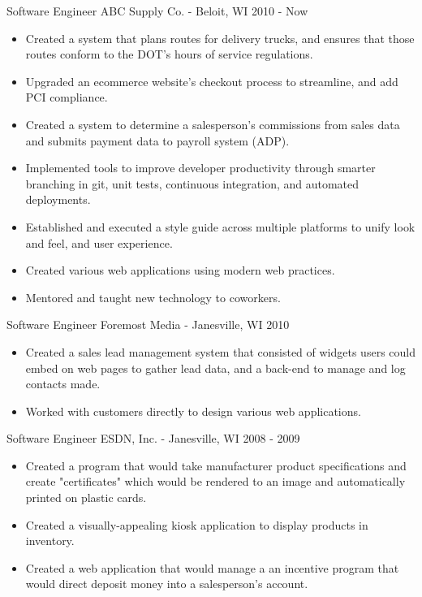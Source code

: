 \documentclass[]{clean-resume}
\begin{document}
\entry
	{Software Engineer}
	{ABC Supply Co. - Beloit, WI}
	{2010 - Now}
	{
		\begin{itemize}
			\item Created a system that plans routes for delivery trucks, and ensures that those routes conform to the DOT's hours of service regulations.
		
			\item Upgraded an ecommerce website's checkout process to streamline, and add PCI compliance.
			
			\item Created a system to determine a salesperson's commissions from sales data and submits payment data to payroll system (ADP).
		
			\item Implemented tools to improve developer productivity through smarter branching in git, unit tests, continuous integration, and automated deployments.
		
			\item Established and executed a style guide across multiple platforms to unify look and feel, and user experience.
		
		
		 	\item Created various web applications using modern web practices.
		
			\item Mentored and taught new technology to coworkers.
		\end{itemize}
		
	}

\entry
	{Software Engineer}
	{Foremost Media - Janesville, WI}
	{2010}
	{
		\begin{itemize}
			\item Created a sales lead management system that consisted of widgets users could embed on web pages to gather lead data, and a back-end to manage and log contacts made.
			\item Worked with customers directly to design various web applications.
		\end{itemize}
		
	}
	
\entry
	{Software Engineer}
	{ESDN, Inc. - Janesville, WI}
	{2008 - 2009}
	{
		\begin{itemize}
			\item Created a program that would take manufacturer product specifications and create "certificates" which would be rendered to an image and automatically printed on plastic cards.
			\item Created a visually-appealing kiosk application to display products in inventory.
			\item Created a web application that would manage a an incentive program that would direct deposit money into a salesperson's account.
		\end{itemize}
		
	}
\end{document}
